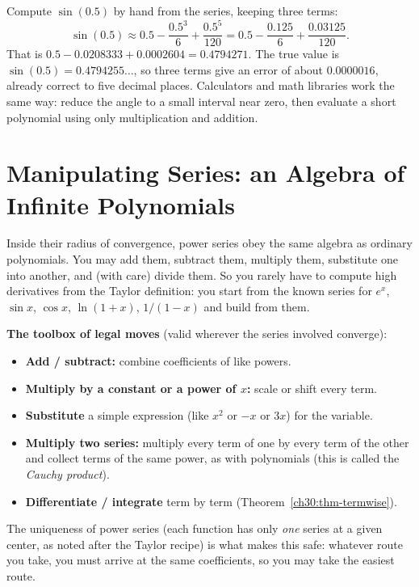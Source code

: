 \begin{labbox}
Compute $\sin(0.5)$ by hand from the series, keeping three terms:
\[
  \sin(0.5) \approx 0.5 - \frac{0.5^3}{6} + \frac{0.5^5}{120}
  = 0.5 - \frac{0.125}{6} + \frac{0.03125}{120}.
\]
That is $0.5 - 0.0208333 + 0.0002604 = 0.4794271$. The true value is $\sin(0.5) = 0.4794255\ldots$, so three terms give an error of about $0.0000016$, already correct to five decimal places. Calculators and math libraries work the same way: reduce the angle to a small interval near zero, then evaluate a short polynomial using only multiplication and addition.
\end{labbox}

\section{Manipulating Series: an Algebra of Infinite Polynomials}
\label{ch30:sec-manipulating}

Inside their radius of convergence, power series obey the same algebra as ordinary polynomials. You may add them, subtract them, multiply them, substitute one into another, and (with care) divide them. So you rarely have to compute high derivatives from the Taylor definition: you start from the known series for $e^x$, $\sin x$, $\cos x$, $\ln(1+x)$, $1/(1-x)$ and build from them.

\begin{focusbox}
\textbf{The toolbox of legal moves} (valid wherever the series involved converge):
\begin{itemize}
  \item \textbf{Add / subtract:} combine coefficients of like powers.
  \item \textbf{Multiply by a constant or a power of $x$:} scale or shift every term.
  \item \textbf{Substitute} a simple expression (like $x^2$ or $-x$ or $3x$) for the variable.
  \item \textbf{Multiply two series:} multiply every term of one by every term of the other and collect terms of the same power, as with polynomials (this is called the \emph{Cauchy product}).
  \item \textbf{Differentiate / integrate} term by term (Theorem~\ref{ch30:thm-termwise}).
\end{itemize}
The uniqueness of power series (each function has only \emph{one} series at a given center, as noted after the Taylor recipe) is what makes this safe: whatever route you take, you must arrive at the same coefficients, so you may take the easiest route.
\end{focusbox}

